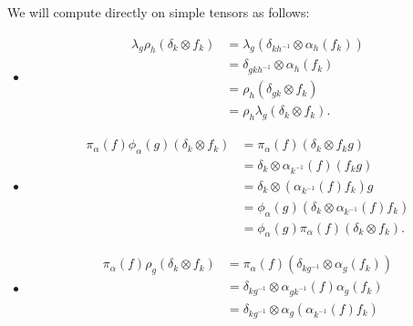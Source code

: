 \documentclass[10pt]{mypackage}
\begin{document}
\begin{solution}
  We will compute directly on simple tensors as follows:
  \begin{itemize}
    \item
      \begin{align*}
        \lambda_g\rho_h\left( \delta_k\otimes f_k \right) &= \lambda_g\left( \delta_{kh^{-1}}\otimes \alpha_h\left( f_k \right) \right)\\
                                                          &= \delta_{gkh^{-1}}\otimes \alpha_h\left( f_k \right)\\
                                                          &= \rho_h\left( \delta_{gk}\otimes f_k \right)\\
                                                          &= \rho_h\lambda_g\left( \delta_k\otimes f_k \right).
      \end{align*}
    \item 
      \begin{align*}
        \pi_{\alpha}(f)\phi_{\alpha}(g)\left( \delta_k\otimes f_k \right) &= \pi_{\alpha}(f)\left( \delta_k\otimes f_kg \right)\\
                                                                          &= \delta_k\otimes \alpha_{k^{-1}}(f)\left( f_kg \right)\\
                                                                          &= \delta_k\otimes \left( \alpha_{k^{-1}}(f)f_k \right)g\\
                                                                          &= \phi_{\alpha}(g)\left( \delta_k\otimes \alpha_{k^{-1}}(f)f_k \right)\\
                                                                          &= \phi_{\alpha}(g)\pi_{\alpha}(f)\left( \delta_k\otimes f_k \right).
      \end{align*}
    \item 
      \begin{align*}
        \pi_{\alpha}(f)\rho_g\left( \delta_k\otimes f_k \right) &= \pi_{\alpha}(f)\left( \delta_{kg^{-1}}\otimes \alpha_g\left( f_k \right) \right)\\
                                                                &= \delta_{kg^{-1}}\otimes \alpha_{gk^{-1}}(f)\alpha_g\left( f_k \right)\\
                                                                &= \delta_{kg^{-1}}\otimes \alpha_g\left( \alpha_{k^{-1}}(f)f_k \right)\\

\end{align*}
\end{itemize}
\end{solution}
\end{document}
